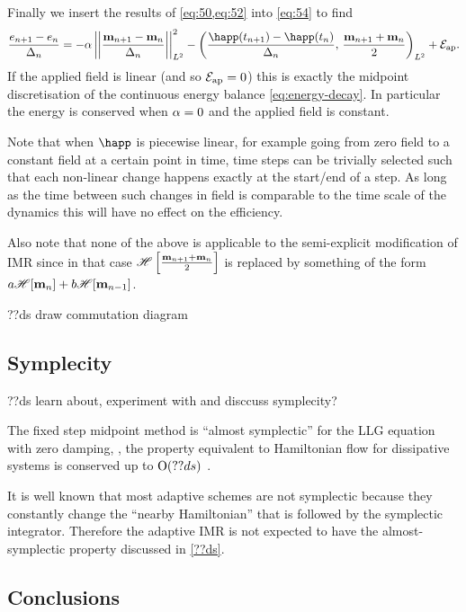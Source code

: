 Finally we insert the results of \cref{eq:50,eq:52} into \cref{eq:54} to find
\begin{equation}
  \frac{\e_{n+1} - \e_n}{\dtn}
  = -\dampc \ltnorm{\mpdmdt}^2
  - \ltip{\frac{\happ(t_{n+1}) -\happ(t_n)}{\dtn}}{\frac{\mv_{n+1} + \mv_{n}}{2}}
  + \happerror.
  \label{eqn:imr-llg-energy}
\end{equation}
If the applied field is linear (and so $\mathcal{E}_\text{ap} = 0$) this is exactly the midpoint discretisation of the continuous energy balance \cref{eq:energy-decay}.
In particular the energy is conserved when $\alpha = 0$ and the applied field is constant.

Note that when $\happ$ is piecewise linear, for example going from zero field to a constant field at a certain point in time, time steps can be trivially selected such that each non-linear change happens exactly at the start/end of a step.
As long as the time between such changes in field is comparable to the time scale of the dynamics this will have no effect on the efficiency.

Also note that none of the above is applicable to the semi-explicit modification of IMR since in that case $\mathscr{H} \left[ \frac{\mathbf{m}_{n+1} + \mathbf{m}_n}{2} \right]$ is replaced by something of the form $a\mathscr{H} {\left[ \mathbf{m}_n \right]} + b\mathscr{H} {\left[ \mathbf{m}_{n-1} \right]}$.

??ds draw commutation diagram

\subsection{Symplecity}

??ds learn about, experiment with and disccuss symplecity?

The fixed step midpoint method is ``almost symplectic'' for the LLG equation with zero damping, , \ie the property equivalent to Hamiltonian flow for  dissipative systems is conserved up to $\text{O}{\left( ??ds \right)}$ \cite{DAquino2005} \cite{Austin1993}.

It is well known that most adaptive schemes are not symplectic\cite[91]{Iserles2009} because they constantly change the ``nearby Hamiltonian'' that is followed by the symplectic integrator.
Therefore the adaptive IMR is not expected to have the almost-symplectic property discussed in \cref{??ds}.


\subsection{Conclusions}

